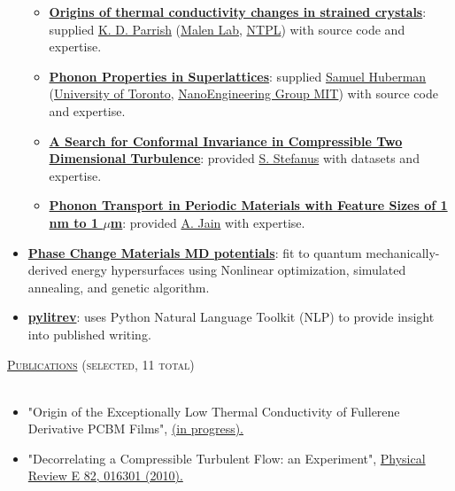 \documentclass{article}
\newcommand{\lineunder}{\vspace*{-8pt} \\ \hspace*{-18pt} \hrulefill \\}
\newcommand{\header}[1]{{\hspace*{-15pt}\vspace*{6pt} \textsc{#1}} \vspace*{-6pt} \lineunder}
\newenvironment{achievements}{\begin{list}{$\bullet$}{\topsep 0pt \itemsep -2pt}}{\vspace*{4pt}\end{list}}
\begin{document}
\begin{itemize}[leftmargin=*]
\begin{itemize}
  \item \textbf{\href{http://ntpl.me.cmu.edu/publications.html}{Origins of thermal conductivity changes in strained crystals}}: supplied \href{http://www.kdparrish.com/}{K. D. Parrish} (\href{http://www.cmu.edu/me/malen/Lab_Website/People.html}{Malen Lab}, \href{http://ntpl.me.cmu.edu/people.html}{NTPL}) with source code and expertise. 

  \item \textbf{\href{https://tspace.library.utoronto.ca/bitstream/1807/42871/1/Huberman_Samuel_C_201311_MASc_thesis.pdf}{Phonon Properties in Superlattices}}: supplied \href{http://web.mit.edu/schuberm/www/}{Samuel Huberman} (\href{http://www.mie.utoronto.ca/labs/atoms/}{University of Toronto}, \href{http://web.mit.edu/nanoengineering/people/students.shtml}{NanoEngineering Group MIT}) with source code and expertise.  

  \item \textbf{\href{http://jasonlarkin.github.io/pub.html}{A Search for Conformal Invariance in Compressible Two Dimensional Turbulence}}: provided \href{http://www.physicsandastronomy.pitt.edu/news-story/phd-defense-stefanus}{S. Stefanus} with  datasets and expertise.     

  \item \textbf{\href{http://blogs.ubc.ca/amerimech2014/files/2014/04/ameritech_mcgaughey_apr14.pdf}{Phonon Transport in Periodic Materials with Feature Sizes of 1 nm to 1 $\mu$m}}: provided \href{http://ntpl.me.cmu.edu/people.html}{A. Jain} with expertise. 

\end{itemize}

\item \textbf{\href{https://github.com/jasonlarkin/pcm-potentials}{Phase Change Materials MD potentials}}: fit to quantum mechanically-derived energy hypersurfaces using Nonlinear optimization, simulated annealing, and genetic algorithm. 

\item \textbf{\href{https://github.com/jasonlarkin/pylitrev}{pylitrev}}: uses Python Natural Language Toolkit (NLP) to provide insight into published writing. 

\end{itemize}

\header{\href{http://jasonlarkin.github.io/pub.html}{Publications} (selected, 11 total)}
\begin{itemize}[leftmargin=*]
\item "Origin of the Exceptionally Low Thermal Conductivity of Fullerene Derivative  PCBM Films", 
\href{http://jasonlarkin.github.io/projects-phd-pcbm.html}{(in progress).}
\item "Decorrelating a Compressible Turbulent Flow: an Experiment", \href{http://pre.aps.org/abstract/PRE/v82/i1/e016301}{Physical Review E 82, 016301 (2010).}
\end{itemize}
\end{document}
